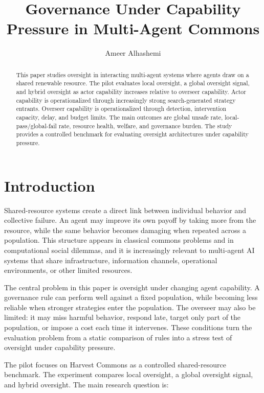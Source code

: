 \documentclass[11pt]{article}
\title{Governance Under Capability Pressure in Multi-Agent Commons}
\author{Ameer Alhashemi}
\date{}
\begin{document}
\maketitle

\begin{abstract}
This paper studies oversight in interacting multi-agent systems where agents draw on a shared renewable resource. The pilot evaluates local oversight, a global oversight signal, and hybrid oversight as actor capability increases relative to overseer capability. Actor capability is operationalized through increasingly strong search-generated strategy entrants. Overseer capability is operationalized through detection, intervention capacity, delay, and budget limits. The main outcomes are global unsafe rate, local-pass/global-fail rate, resource health, welfare, and governance burden. The study provides a controlled benchmark for evaluating oversight architectures under capability pressure.
\end{abstract}

\section{Introduction}

Shared-resource systems create a direct link between individual behavior and collective failure. An agent may improve its own payoff by taking more from the resource, while the same behavior becomes damaging when repeated across a population. This structure appears in classical commons problems and in computational social dilemmas, and it is increasingly relevant to multi-agent AI systems that share infrastructure, information channels, operational environments, or other limited resources.

The central problem in this paper is oversight under changing agent capability. A governance rule can perform well against a fixed population, while becoming less reliable when stronger strategies enter the population. The overseer may also be limited: it may miss harmful behavior, respond late, target only part of the population, or impose a cost each time it intervenes. These conditions turn the evaluation problem from a static comparison of rules into a stress test of oversight under capability pressure.

The pilot focuses on Harvest Commons as a controlled shared-resource benchmark. The experiment compares local oversight, a global oversight signal, and hybrid oversight. The main research question is:
\end{document}
